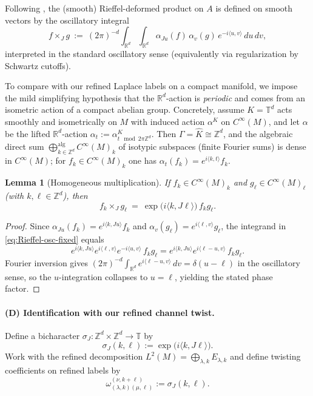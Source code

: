 \documentclass[11pt]{amsart}
\theoremstyle{plain}
\newtheorem{lemma}[theorem]{Lemma}
\theoremstyle{definition}
\theoremstyle{remark}
\newcommand{\bbR}{\mathbb{R}}
\newcommand{\bbZ}{\mathbb{Z}}
\newcommand{\bbT}{\mathbb{T}}
\begin{document}
Following \cite{Rieffel}, the (smooth) Rieffel-deformed product on $A$ is defined on smooth vectors by the oscillatory integral
\begin{equation}\label{eq:Rieffel-osc-fixed}
f\times_J g \ :=\ (2\pi)^{-d}\int_{\bbR^d}\int_{\bbR^d} \alpha_{Ju}(f)\,\alpha_v(g)\,
e^{-i\langle u,v\rangle}\,du\,dv,
\end{equation}
interpreted in the standard oscillatory sense (equivalently via regularization by Schwartz cutoffs).

To compare with our refined Laplace labels on a compact manifold, we impose the mild simplifying hypothesis that the $\bbR^d$-action is
\emph{periodic} and comes from an isometric action of a compact abelian group.
Concretely, assume $K=\bbT^d$ acts smoothly and isometrically on $M$ with induced action $\alpha^K$ on $C^\infty(M)$,
and let $\alpha$ be the lifted $\bbR^d$-action $\alpha_t:=\alpha^K_{t\!\!\mod 2\pi\bbZ^d}$.
Then $\Gamma=\widehat K\cong\bbZ^d$, and the algebraic direct sum $\bigoplus_{k\in\bbZ^d}^{\mathrm{alg}}C^\infty(M)_k$ of isotypic subspaces (finite Fourier sums) is dense in $C^\infty(M)$; for $f_k\in C^\infty(M)_k$ one has $\alpha_t(f_k)=e^{i\langle k,t\rangle}f_k$.

\begin{lemma}[Homogeneous multiplication]\label{lem:Rieffel-hom-fixed}
If $f_k\in C^\infty(M)_k$ and $g_\ell\in C^\infty(M)_\ell$ (with $k,\ell\in\bbZ^d$), then
\[
f_k\times_J g_\ell \ =\ \exp\!\big(i\langle k,J\ell\rangle\big)\, f_k g_\ell.
\]
\end{lemma}

\begin{proof}
Since $\alpha_{Ju}(f_k)=e^{i\langle k,Ju\rangle}f_k$ and $\alpha_v(g_\ell)=e^{i\langle \ell,v\rangle}g_\ell$,
the integrand in \eqref{eq:Rieffel-osc-fixed} equals
\[
e^{i\langle k,Ju\rangle}e^{i\langle \ell,v\rangle}e^{-i\langle u,v\rangle}\,f_k g_\ell
= e^{i\langle k,Ju\rangle}e^{i\langle \ell-u,v\rangle}\,f_k g_\ell.
\]
Fourier inversion gives $(2\pi)^{-d}\int_{\bbR^d} e^{i\langle \ell-u,v\rangle}\,dv=\delta(u-\ell)$ in the oscillatory sense,
so the $u$-integration collapses to $u=\ell$, yielding the stated phase factor.
\end{proof}

\paragraph{(D) Identification with our refined channel twist.}
Define a bicharacter $\sigma_J:\bbZ^d\times\bbZ^d\to\bbT$ by
\begin{equation}\label{eq:sigmaJ-fixed}
\sigma_J(k,\ell):=\exp\!\big(i\langle k,J\ell\rangle\big).
\end{equation}
Work with the refined decomposition $L^2(M)=\bigoplus_{\lambda,k}E_{\lambda,k}$ and define twisting coefficients on refined labels by
\[
\omega^{(\nu,k+\ell)}_{(\lambda,k)(\mu,\ell)} := \sigma_J(k,\ell).
\]
\end{document}
